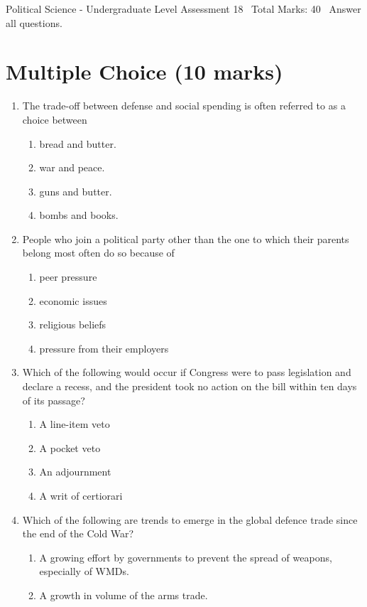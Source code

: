\documentclass[12pt]{article}
\begin{document}
\begin{center}
Political Science - Undergraduate Level Assessment 18 \
Total Marks: 40 \
Answer all questions.
\end{center}

\section*{Multiple Choice (10 marks)}
\begin{enumerate}[label=\arabic*.]
\item The trade-off between defense and social spending is often referred to as a choice between
\begin{enumerate}[label=(\alph*)]
    \item bread and butter.
    \item war and peace.
    \item guns and butter.
    \item bombs and books.
\end{enumerate}
\item People who join a political party other than the one to which their parents belong most often do so because of
\begin{enumerate}[label=(\alph*)]
    \item peer pressure
    \item economic issues
    \item religious beliefs
    \item pressure from their employers
\end{enumerate}
\item Which of the following would occur if Congress were to pass legislation and declare a recess, and the president took no action on the bill within ten days of its passage?
\begin{enumerate}[label=(\alph*)]
    \item A line-item veto
    \item A pocket veto
    \item An adjournment
    \item A writ of certiorari
\end{enumerate}
\item Which of the following are trends to emerge in the global defence trade since the end of the Cold War?
\begin{enumerate}[label=(\alph*)]
    \item A growing effort by governments to prevent the spread of weapons, especially of WMDs.
    \item A growth in volume of the arms trade.

\end{enumerate}
\end{enumerate}
\end{document}

